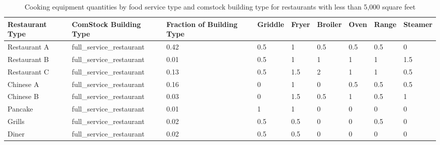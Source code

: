 \begin{table}[]
    \small
    \centering
    \caption[Cooking equipment quantities by food service type and comstock building type for restaurants with less than 5,000 square feet]{Cooking equipment quantities by food service type and comstock building type for restaurants with less than 5,000 square feet}
    \label{tab:kitchen_cook_counts_res_lt5k}
    \begin{tabular}{|l|l|l|l|l|l|l|l|l|}
    \hline
    \textbf{Restaurant Type} & \textbf{ComStock Building Type} & \textbf{Fraction of Building Type} & \textbf{Griddle} & \textbf{Fryer} & \textbf{Broiler} & \textbf{Oven} & \textbf{Range} & \textbf{Steamer} \\ \hline
    Restaurant A             & full\_service\_restaurant       & 0.42                               & 0.5              & 1              & 0.5              & 0.5           & 0.5            & 0                \\ \hline
    Restaurant B             & full\_service\_restaurant       & 0.01                               & 0.5              & 1              & 1                & 1             & 1              & 1.5              \\ \hline
    Restaurant C             & full\_service\_restaurant       & 0.13                               & 0.5              & 1.5            & 2                & 1             & 1              & 0.5              \\ \hline
    Chinese A                & full\_service\_restaurant       & 0.16                               & 0                & 1              & 0                & 0.5           & 0.5            & 0.5              \\ \hline
    Chinese B                & full\_service\_restaurant       & 0.03                               & 0                & 1.5            & 0.5              & 1             & 0.5            & 1                \\ \hline
    Pancake                  & full\_service\_restaurant       & 0.01                               & 1                & 1              & 0                & 0             & 0              & 0                \\ \hline
    Grills                   & full\_service\_restaurant       & 0.02                               & 0.5              & 0.5            & 0                & 0             & 0.5            & 0                \\ \hline
    Diner                    & full\_service\_restaurant       & 0.02                               & 0.5              & 0.5            & 0                & 0             & 0              & 0                \\ \hline

\end{tabular}
\end{table}
